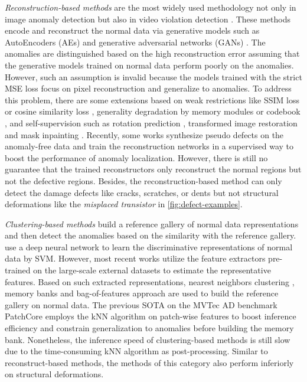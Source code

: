 \documentclass[lettersize,journal]{IEEEtran}
\begin{document}
\textit{Reconstruction-based methods} are the most widely used methodology not only in image anomaly detection but also in video violation detection \cite{sabokrou2017deepcascade, ergen2019unsupervised, luo2017stc}. These methods encode and reconstruct the normal data via generative models such as AutoEncoders (AEs) \cite{zhou2017anoae, akcay2018ganomaly,liu2020vevqe, zhou2021memorizing} and generative adversarial networks (GANs) \cite{perera2019ocgan}. The anomalies are distinguished based on the high reconstruction error assuming that the generative models trained on normal data perform poorly on the anomalies. However, such an assumption is invalid because the models trained with the strict MSE loss focus on pixel reconstruction and generalize to anomalies. To address this problem, there are some extensions based on weak restrictions like SSIM loss \cite{bergmann2018improving} or cosine similarity loss \cite{deng2022distillation}, generality degradation by memory modules \cite{gong2019memorizing} or codebook \cite{marimont2021anomaly}, and self-supervision such as rotation prediction \cite{hendrycks2019using}, transformed image restoration \cite{fei2020attribute} and mask inpainting \cite{zavrtanik2021riad}. Recently, some works \cite{li2021cutpaste, zavrtanik2021draem} synthesize pseudo defects on the anomaly-free data and train the reconstruction networks in a supervised way to boost the performance of anomaly localization. However, there is still no guarantee that the trained reconstructors only reconstruct the normal regions but not the defective regions. Besides, the reconstruction-based method can only detect the damage defects like cracks, scratches, or dents but not structural deformations like the \textit{misplaced transistor} in \ref{fig:defect-examples}.

\textit{Clustering-based methods} \cite{liu2021anomaly} build a reference gallery of normal data representations and then detect the anomalies based on the similarity with the reference gallery. \cite{ruff2018deepsvdd} use a deep neural network to learn the discriminative representations of normal data by SVM. However, most recent works utilize the feature extractors \cite{he2016resnet,zagoruyko2016wide,xie2017resnext} pre-trained on the large-scale external datasets \cite{deng2009imagenet} to estimate the representative features. Based on such extracted representations,  nearest neighbors clustering \cite{bergman2020deepknn,reiss2021panda}, memory banks \cite{cohen2020spade} and bag-of-features approach \cite{defard2021padim} are used to build the reference gallery on normal data. The previous SOTA on the MVTec AD benchmark PatchCore \cite{roth2021patchcore} employs the kNN algorithm on patch-wise features to boost inference efficiency and constrain generalization to anomalies before building the memory bank. Nonetheless, the inference speed of clustering-based methods is still slow due to the time-consuming kNN algorithm as post-processing. Similar to reconstruct-based methods, the methods of this category also perform inferiorly on structural deformations.
\end{document}
